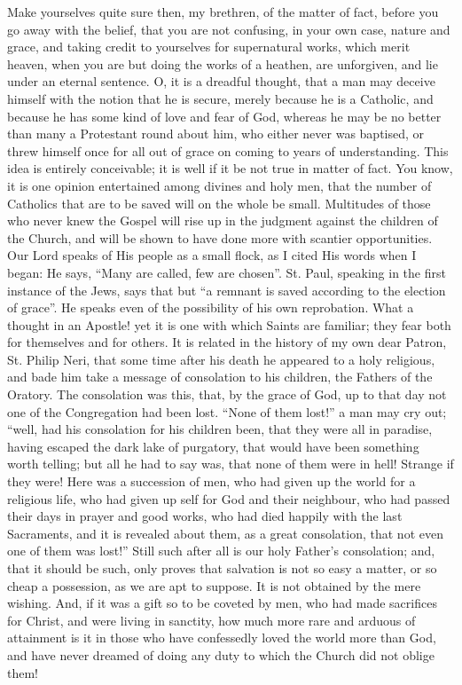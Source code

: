 Make yourselves quite sure then, my brethren, of the matter of
fact, before you go away with the belief, that you are not confusing,
in your own case, nature and grace, and taking credit to yourselves
for supernatural works, which merit heaven, when you are but doing the
works of a heathen, are unforgiven, and lie under an eternal sentence.
O, it is a dreadful thought, that a man may deceive himself with the
notion that he is secure, merely because he is a Catholic, and because
he has some kind of love and fear of God, whereas he may be no better
than many a Protestant round about him, who either never was baptised,
or threw himself once for all out of grace on coming to years of
understanding. This idea is entirely conceivable; it is well if it be
not true in matter of fact. You know, it is one opinion entertained
among divines and holy men, that the number of Catholics that are to
be saved will on the whole be small. Multitudes of those who never
knew the Gospel will rise up in the judgment against the children of
the Church, and will be shown to have done more with scantier
opportunities. Our Lord speaks of His people as a small flock, as I
cited His words when I began: He says, ``Many are called, few are
chosen''. St. Paul, speaking in the first instance of the Jews,
says that but ``a remnant is saved according to the election of
grace''. He speaks even of the possibility of his own reprobation.
What a thought in an Apostle! yet it is one with which Saints are
familiar; they fear both for themselves and for others. It is related
in the history of my own dear Patron, St. Philip Neri, that some time
after his death he appeared to a holy religious, and bade him take a
message of consolation to his children, the Fathers of the Oratory.
The consolation was this, that, by the grace of God, up to that day
not one of the Congregation had been lost. ``None of them
lost!'' a man may cry out; ``well, had his consolation for his
children been, that they were all in paradise, having escaped the dark
lake of purgatory, that would have been something worth telling; but
all he had to say was, that none of them were in hell! Strange if they
were! Here was a succession of men, who had given up the world for a
religious life, who had given up self for God and their neighbour, who
had passed their days in prayer and good works, who had died happily
with the last Sacraments, and it is revealed about them, as a great
consolation, that not even one of them was lost!'' Still such
after all is our holy Father's consolation; and, that it should be
such, only proves that salvation is not so easy a matter, or so cheap
a possession, as we are apt to suppose. It is not obtained by the mere
wishing. And, if it was a gift so to be coveted by men, who had made
sacrifices for Christ, and were living in sanctity, how much more rare
and arduous of attainment is it in those who have confessedly loved
the world more than God, and have never dreamed of doing any duty to
which the Church did not oblige them!

